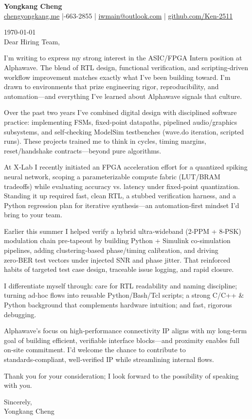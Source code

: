 \documentclass[11pt]{article}
\begin{document}
{\Large \textbf{Yongkang Cheng}}\\[2pt]
\href{https://chengyongkang.me/}{chengyongkang.me} \;|-663-2855 \;|\; \href{mailto:iwmain@outlook.com}{iwmain@outlook.com} \;|\; \href{https://github.com/Ken-2511}{github.com/Ken-2511}

\today\\[0.8em]

Dear Hiring Team,

I’m writing to express my strong interest in the ASIC/FPGA Intern position at Alphawave. The blend of RTL design, functional verification, and scripting-driven workflow improvement matches exactly what I’ve been building toward. I’m drawn to environments that prize engineering rigor, reproducibility, and automation—and everything I’ve learned about Alphawave signals that culture.

Over the past two years I’ve combined digital design with disciplined software practice: implementing FSMs, fixed‑point datapaths, pipelined audio/graphics subsystems, and self‑checking ModelSim testbenches (wave.do iteration, scripted runs). These projects trained me to think in cycles, timing margins, reset/handshake contracts—beyond pure algorithms.

At X‑Lab I recently initiated an FPGA acceleration effort for a quantized spiking neural network, scoping a parameterizable compute fabric (LUT/BRAM tradeoffs) while evaluating accuracy vs. latency under fixed‑point quantization. Standing it up required fast, clean RTL, a stubbed verification harness, and a Python regression plan for iterative synthesis—an automation‑first mindset I’d bring to your team.

Earlier this summer I helped verify a hybrid ultra‑wideband (2‑PPM + 8‑PSK) modulation chain pre‑tapeout by building Python + Simulink co‑simulation pipelines, adding clustering‑based phase/timing calibration, and driving zero‑BER test vectors under injected SNR and phase jitter. That reinforced habits of targeted test case design, traceable issue logging, and rapid closure.

I differentiate myself through: care for RTL readability and naming discipline; turning ad-hoc flows into reusable Python/Bash/Tcl scripts; a strong C/C++ \& Python background that complements hardware intuition; and fast, rigorous debugging.

Alphawave’s focus on high‑performance connectivity IP aligns with my long‑term goal of building efficient, verifiable interface blocks—and proximity enables full on‑site commitment. I’d welcome the chance to contribute to standards‑compliant, well‑verified IP while streamlining internal flows.

Thank you for your consideration; I look forward to the possibility of speaking with you.

\vspace{1em}
Sincerely,\\[1.2em]
Yongkang Cheng
\end{document}
